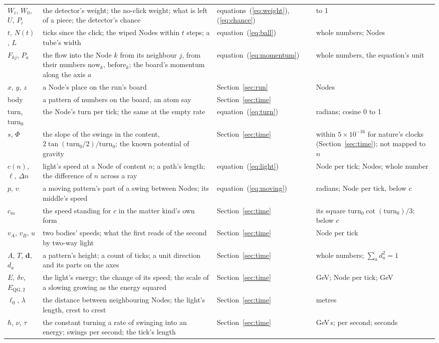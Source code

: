 \documentclass[pdflatex,sn-mathphys-num]{sn-jnl}
\begin{document}
\begin{table}[!t]
\begin{tabular}{>{\raggedright\arraybackslash}p{1.5cm}>{\raggedright\arraybackslash}p{6.4cm}>{\raggedright\arraybackslash}p{1.7cm}>{\raggedright\arraybackslash}p{3.0cm}}
$W_i$, $W_0$, $U$, $P_i$ & the detector's weight; the no-click weight; what is left of a piece; the detector's chance & equations~(\ref{eq:weight}), (\ref{eq:chance}) & 0 to 1 \\
$t$, $N(t)$, $L$ & ticks since the click; the wiped Nodes within $t$ steps; a tube's width & equation~(\ref{eq:ball}) & whole numbers; Nodes \\
$F_{kj}$, $P_a$ & the flow into the Node $k$ from its neighbour $j$, from their numbers $\mathrm{now}_k$, $\mathrm{before}_k$; the board's momentum along the axis $a$ & equation~(\ref{eq:momentum}) & whole numbers, the equation's unit \\
$x$, $y$, $z$ & a Node's place on the run's board & Section~\ref{sec:run} & Nodes \\
body & a pattern of numbers on the board, an atom say & Section~\ref{sec:time} & \\
turn, $\mathrm{turn}_0$ & the Node's turn per tick; the same at the empty rate & equation~(\ref{eq:turn}) & radians; cosine 0 to 1 \\
$s$, $\Phi$ & the slope of the swings in the content, $2\tan(\mathrm{turn}_0/2)/\mathrm{turn}_0$; the known potential of gravity & Section~\ref{sec:time} & 1 within $5 \times 10^{-16}$ for nature's clocks (Section~\ref{sec:time}); not mapped to $n$ \\
$c(n)$, $\ell$, $\Delta n$ & light's speed at a Node of content $n$; a path's length; the difference of $n$ across a ray & equation~(\ref{eq:light}) & Node per tick; Nodes; whole number \\
$p$, $v$ & a moving pattern's part of a swing between Nodes; its middle's speed & equation~(\ref{eq:moving}) & radians; Node per tick, below $c$ \\
$c_m$ & the speed standing for $c$ in the matter kind's own form & Section~\ref{sec:time} & its square $\mathrm{turn}_0\cot(\mathrm{turn}_0)/3$; below $c$ \\
$v_A$, $v_B$, $u$ & two bodies' speeds; what the first reads of the second by two-way light & Section~\ref{sec:time} & Node per tick \\
$A$, $T$, $\mathbf d$, $d_a$ & a pattern's height; a count of ticks; a unit direction and its parts on the axes & Section~\ref{sec:time} & whole numbers; $\sum_a d_a^2 = 1$ \\
$E$, $\delta v$, $E_{\mathrm{QG},2}$ & the light's energy; the change of its speed; the scale of a slowing growing as the energy squared & Section~\ref{sec:time} & GeV; Node per tick; GeV \\
$\ell_0$, $\lambda$ & the distance between neighbouring Nodes; the light's length, crest to crest & Section~\ref{sec:time} & metres \\
$\hbar$, $\nu$, $\tau$ & the constant turning a rate of swinging into an energy; swings per second; the tick's length & Section~\ref{sec:time} & GeV\,s; per second; seconds \\
\bottomrule
\end{tabular}
\end{table}
\end{document}
